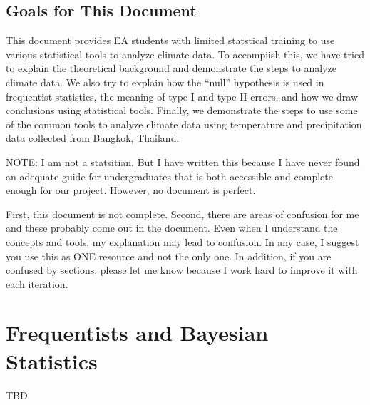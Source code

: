 \documentclass{article}\usepackage[]{graphicx}\usepackage[]{color}
\begin{document}
\subsection{Goals for This Document}

This document provides EA students with limited statstical training to use various statistical tools to analyze climate data. To accompiish this, we have tried to explain the theoretical background and demonstrate the steps to analyze climate data. We also try to explain how the ``null'' hypothesis is used in frequentist statistics, the meaning of type I and type II errors, and how we draw conclusions using statistical tools. Finally, we demonstrate the steps to use some of the common tools to analyze climate data using temperature and precipitation data collected from Bangkok, Thailand. 

NOTE: I am not a statsitian. But I have written this because I have never found an adequate guide for undergraduates that is both accessible and complete enough for our project. However, no document is perfect.

First, this document is not complete. Second, there are areas of confusion for me and these probably come out in the document. Even when I understand the concepts and tools, my explanation may lead to confusion. In any case, I suggest you use this as ONE resource and not the only one. In addition, if you are confused by sections, please let me know because I work hard to improve it with each iteration. 

\section{Frequentists and Bayesian Statistics}

TBD



\end{document}

